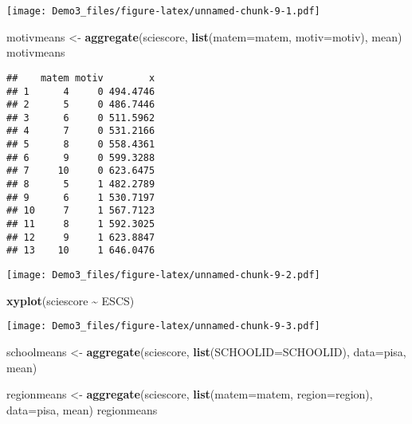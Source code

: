 \documentclass[
]{article}
\newenvironment{Shaded}{\begin{snugshade}}{\end{snugshade}}
\newcommand{\AttributeTok}[1]{\textcolor[rgb]{0.13,0.29,0.53}{#1}}
\newcommand{\FunctionTok}[1]{\textcolor[rgb]{0.13,0.29,0.53}{\textbf{#1}}}
\newcommand{\NormalTok}[1]{#1}
\newcommand{\OtherTok}[1]{\textcolor[rgb]{0.56,0.35,0.01}{#1}}
\newcommand{\SpecialCharTok}[1]{\textcolor[rgb]{0.81,0.36,0.00}{\textbf{#1}}}
\newcommand{\StringTok}[1]{\textcolor[rgb]{0.31,0.60,0.02}{#1}}
\begin{document}
\texttt{[image: Demo3\_files/figure-latex/unnamed-chunk-9-1.pdf]}

\begin{Shaded}
\begin{Highlighting}[]
\NormalTok{motivmeans }\OtherTok{\textless{}{-}} \FunctionTok{aggregate}\NormalTok{(sciescore, }\FunctionTok{list}\NormalTok{(}\AttributeTok{matem=}\NormalTok{matem, }\AttributeTok{motiv=}\NormalTok{motiv), mean)}
\NormalTok{motivmeans}
\end{Highlighting}
\end{Shaded}

\begin{verbatim}
##    matem motiv        x
## 1      4     0 494.4746
## 2      5     0 486.7446
## 3      6     0 511.5962
## 4      7     0 531.2166
## 5      8     0 558.4361
## 6      9     0 599.3288
## 7     10     0 623.6475
## 8      5     1 482.2789
## 9      6     1 530.7197
## 10     7     1 567.7123
## 11     8     1 592.3025
## 12     9     1 623.8847
## 13    10     1 646.0476
\end{verbatim}

\begin{Shaded}
\end{Shaded}

\texttt{[image: Demo3\_files/figure-latex/unnamed-chunk-9-2.pdf]}

\begin{Shaded}
\begin{Highlighting}[]
\FunctionTok{xyplot}\NormalTok{(sciescore }\SpecialCharTok{\textasciitilde{}}\NormalTok{ ESCS)}
\end{Highlighting}
\end{Shaded}

\texttt{[image: Demo3\_files/figure-latex/unnamed-chunk-9-3.pdf]}

\begin{Shaded}
\begin{Highlighting}[]
\NormalTok{schoolmeans }\OtherTok{\textless{}{-}} \FunctionTok{aggregate}\NormalTok{(sciescore, }\FunctionTok{list}\NormalTok{(}\AttributeTok{SCHOOLID=}\NormalTok{SCHOOLID), }\AttributeTok{data=}\NormalTok{pisa, mean)}

\NormalTok{regionmeans }\OtherTok{\textless{}{-}} \FunctionTok{aggregate}\NormalTok{(sciescore, }\FunctionTok{list}\NormalTok{(}\AttributeTok{matem=}\NormalTok{matem, }\AttributeTok{region=}\NormalTok{region), }\AttributeTok{data=}\NormalTok{pisa, mean)}
\NormalTok{regionmeans}
\end{Highlighting}
\end{Shaded}
\end{document}
